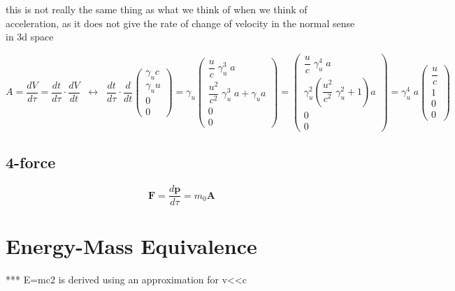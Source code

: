 this is not really the same thing as what we think of when we think of acceleration, as it does not give the rate of change of velocity in the normal sense in 3d space

\begin{equation}
	A=\dfrac{dV}{d\tau}=
	\dfrac{dt}{d\tau}\cdot\dfrac{dV}{dt} \;\;\leftrightarrow\;\; \dfrac{dt}{d\tau}\cdot \dfrac{d}{dt}
	\left(\begin{array}{*{20}{c}} \gamma_u c \\ \gamma_u u \\ 0 \\ 0 \end{array}\right)
	= \gamma_u
	\left(\begin{array}{*{20}{c}} \dfrac{u}{c}\;\gamma_u^3\;a \\ \dfrac{u^2}{c^2}\;\gamma_u^3\;a+\gamma_u a \\ 0 \\ 0 \end{array}\right)
	=
	\left(\begin{array}{*{20}{c}} \dfrac{u}{c}\;\gamma_u^4\;a \\ \gamma_u^2\left(\dfrac{u^2}{c^2}\;\gamma_u^2+1\right)a \\ 0 \\ 0 \end{array}\right)
	= \gamma_u^4\;a
	\left(\begin{array}{*{20}{c}} \dfrac{u}{c} \\ 1 \\ 0 \\ 0 \end{array}\right)
\end{equation}

\subsection{4-force}
\begin{equation}
	\mathbf{F}= \frac{d\mathbf{p}}{d\tau} = m_0\mathbf{A}
\end{equation}

\section{Energy-Mass Equivalence}

*** E=mc2 is derived using an approximation for v<<c

